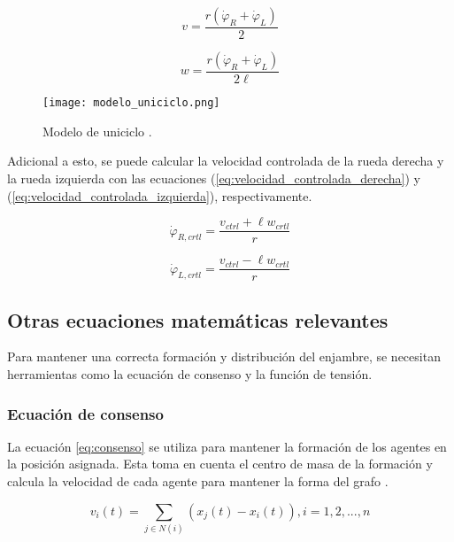 \begin{equation}
	v = \frac{r(\dot{\varphi}_R + \dot{\varphi}_L)}{2}
	\label{eq:velocidad_lineal_uniciclo}
\end{equation}

\begin{equation}
	w = \frac{r(\dot{\varphi}_R + \dot{\varphi}_L)}{2\ell}
	\label{eq:velocidad_angular_uniciclo}
\end{equation}

\begin{figure}[H]
	\centering
	\texttt{[image: modelo\_uniciclo.png]}
	\caption{Modelo de uniciclo \cite{ZeaM_modelo_uniciclo}.}
	\label{fig:modelo_uniciclo}
\end{figure}

Adicional a esto, se puede calcular la velocidad controlada de la rueda derecha y la rueda izquierda con las ecuaciones (\ref{eq:velocidad_controlada_derecha}) y (\ref{eq:velocidad_controlada_izquierda}), respectivamente.

\begin{equation}
	\dot{\varphi}_{R,crtl} = \frac{v_{ctrl} + \ell w_{crtl}}{r}
	\label{eq:velocidad_controlada_derecha}
\end{equation}

\begin{equation}
	\dot{\varphi}_{L,crtl} = \frac{v_{ctrl} - \ell w_{crtl}}{r}
	\label{eq:velocidad_controlada_izquierda}
\end{equation}

\subsection*{Otras ecuaciones matemáticas relevantes}
Para mantener una correcta formación y distribución del enjambre, se necesitan herramientas como la ecuación de consenso y la función de tensión.

\subsubsection*{Ecuación de consenso}
La ecuación \ref{eq:consenso} se utiliza para mantener la formación de los agentes en la posición asignada. Esta toma en cuenta el centro de masa de la formación y calcula la velocidad de cada agente para mantener la forma del grafo \cite{PenaAM_2019_tesis}.

\begin{equation}
	v_i(t) = \sum_{j \in N(i)} (x_j(t) - x_i(t)), i = 1, 2, ..., n
	\label{eq:consenso}
\end{equation}

